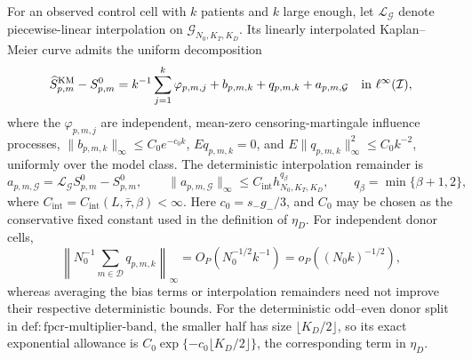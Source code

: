 For an observed control cell with \(k\) patients and \(k\) large enough, let \(\mathcal L_{\mathcal G}\) denote piecewise-linear interpolation on \(\mathcal G_{N_0,K_T,K_D}\).  Its linearly interpolated Kaplan--Meier curve admits the uniform decomposition
\[
 \widehat S^{\mathrm{KM}}_{p,m}-S^0_{p,m}
 =k^{-1}\sum_{j=1}^{k}\varphi_{p,m,j}+b_{p,m,k}+q_{p,m,k}+a_{p,m,\mathcal G}
 \quad\hbox{in }\ell^\infty(\mathcal I),
\]
where the \(\varphi_{p,m,j}\) are independent, mean-zero censoring-martingale influence processes, \(\|b_{p,m,k}\|_\infty\le C_0e^{-c_0k}\), \(E q_{p,m,k}=0\), and \(E\|q_{p,m,k}\|_\infty^2\le C_0k^{-2}\), uniformly over the model class.  The deterministic interpolation remainder is
\[
 a_{p,m,\mathcal G}=\mathcal L_{\mathcal G}S^0_{p,m}-S^0_{p,m},
 \qquad
 \|a_{p,m,\mathcal G}\|_\infty
 \le C_{\mathrm{int}}h_{N_0,K_T,K_D}^{q_\beta},
 \qquad q_\beta=\min\{\beta+1,2\},
\]
where \(C_{\mathrm{int}}=C_{\mathrm{int}}(L,\bar\tau,\beta)<\infty\).  Here \(c_0=s_-g_-/3\), and \(C_0\) may be chosen as the conservative fixed constant used in the definition of \(\eta_D\).  For independent donor cells,
\[
 \left\|N_0^{-1}\sum_{m\in\mathcal D}q_{p,m,k}\right\|_\infty
 =O_P(N_0^{-1/2}k^{-1})
 =o_P((N_0k)^{-1/2}),
\]
whereas averaging the bias terms or interpolation remainders need not improve their respective deterministic bounds.  For the deterministic odd--even donor split in \(\mathrm{def:fpcr\mbox{-}multiplier\mbox{-}band}\), the smaller half has size \(\lfloor K_D/2\rfloor\), so its exact exponential allowance is \(C_0\exp\{-c_0\lfloor K_D/2\rfloor\}\), the corresponding term in \(\eta_D\).